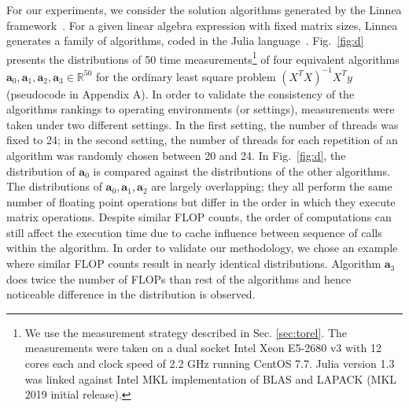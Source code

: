 \documentclass[conference]{IEEEtran}
\begin{document}
For our experiments, we consider the solution algorithms generated by the Linnea
framework~\cite{barthels2019linnea}. For a given linear algebra expression with fixed matrix sizes, Linnea generates a
family of algorithms, coded in the Julia language~\cite{julia}.  Fig.~\ref{fig:d} presents the distributions of 50 time measurements\footnote{We
  use the measurement strategy described in Sec. \ref{sec:torel}. The measurements were taken on a dual  socket Intel
  Xeon E5-2680 v3 with 12 cores each and clock speed of 2.2 GHz running CentOS 7.7. Julia version 1.3 was linked against
  Intel MKL implementation of BLAS and LAPACK (MKL 2019 initial release).} of four equivalent algorithms $\mathbf{a}_0,
\mathbf{a}_1, \mathbf{a}_2, \mathbf{a}_3 \in \mathbb{R}^{50}$ for the ordinary least square problem  $(X^TX)^{-1}X^{T}y$
(pseudocode in Appendix A). In order to validate the consistency of the algorithms rankings to operating environments (or settings),  measurements were taken under two different settings. In the first setting, the number
of threads was fixed to 24; in the second setting, the number of threads for each repetition of an algorithm was
randomly chosen between 20 and 24. In
Fig.~\ref{fig:d}, the distribution of $\mathbf{a}_0$ is compared against the distributions of the other algorithms.  The
distributions of $\mathbf{a}_0, \mathbf{a}_1, \mathbf{a}_2$ are largely overlapping; they all perform the same number of
floating point operations but differ in the order in which they execute matrix operations. Despite similar FLOP counts,
the order of computations can still affect the execution time due to cache influence between sequence of calls within
the algorithm\cite{peise2014cache}. In order to validate our methodology, we chose an example where similar FLOP counts
result in nearly identical distributions.
Algorithm $\mathbf{a}_3$ does twice the number of FLOPs than rest of the algorithms and hence noticeable difference in the distribution is observed.
\end{document}

